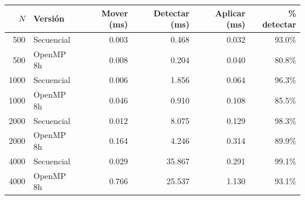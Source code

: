 \begin{tabular}{rlrrrr}
\toprule
$N$ & Versión & Mover (ms) & Detectar (ms) & Aplicar (ms) & \% detectar \\
\midrule
500 & Secuencial & 0.003 & 0.468 & 0.032 & 93.0\% \\
500 & OpenMP 8h & 0.008 & 0.204 & 0.040 & 80.8\% \\
1000 & Secuencial & 0.006 & 1.856 & 0.064 & 96.3\% \\
1000 & OpenMP 8h & 0.046 & 0.910 & 0.108 & 85.5\% \\
2000 & Secuencial & 0.012 & 8.075 & 0.129 & 98.3\% \\
2000 & OpenMP 8h & 0.164 & 4.246 & 0.314 & 89.9\% \\
4000 & Secuencial & 0.029 & 35.867 & 0.291 & 99.1\% \\
4000 & OpenMP 8h & 0.766 & 25.537 & 1.130 & 93.1\% \\
\bottomrule
\end{tabular}
